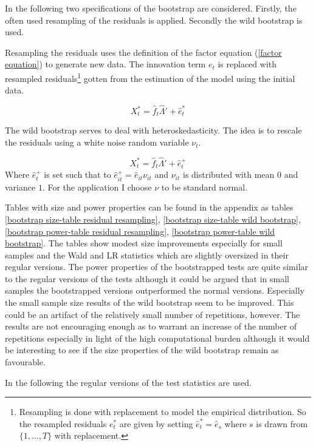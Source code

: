 \documentclass[12pt]{article}
\begin{document}
In the following two specifications of the bootstrap are considered. Firstly, the often used resampling of the residuals is applied. Secondly the wild bootstrap is used. 

Resampling the residuals uses the definition of the factor equation (\ref{factor equation}) to generate new data. The innovation term $e_t$ is replaced with resampled residuals\footnote{Resampling is done with replacement to model the empirical distribution. So the resampled residuals $e_t^*$ are given by setting $\hat e_t^* = \hat e_s$ where $s$ is drawn from $\{1, ..., T\}$ with replacement.} gotten from the estimation of the model using the initial data.

\begin{equation}
	\label{factor equation, bootstrapped}
	X_t^* = \hat f_t \hat \Lambda' + \hat e_t^*
\end{equation}

The wild bootstrap serves to deal with heteroskedasticity. The idea is to rescale the residuals using a white noise random variable $\nu_t$.

$$X_t^* = \hat f_t \hat \Lambda' + \hat e_t^+$$
Where $\hat e_t^+$ is set such that to $\hat e_{it}^+ = \hat e_{it} \nu_{it}$ and $\nu_{it}$ is distributed with mean $0$ and variance $1$. For the application I choose $\nu$ to be standard normal.


Tables with size and power properties can be found in the appendix as tables \ref{bootstrap size-table residual resampling}, \ref{bootstrap size-table wild bootstrap}, \ref{bootstrap power-table residual resampling}, \ref{bootstrap power-table wild bootstrap}. The tables show modest size improvements especially for small samples and the Wald and LR statistics which are slightly oversized in their regular versions. The power properties of the bootstrapped tests are quite similar to the regular versions of the tests although it could be argued that in small samples the bootstrapped versions outperformed the normal versions.
Especially the small sample size results of the wild bootstrap seem to be improved. This could be an artifact of the relatively small number of repetitions, however. The results are not encouraging enough as to warrant an increase of the number of repetitions especially in light of the high computational burden although it would be interesting to see if the size properties of the wild bootstrap remain as favourable.

In the following the regular versions of the test statistics are used.
\end{document}
